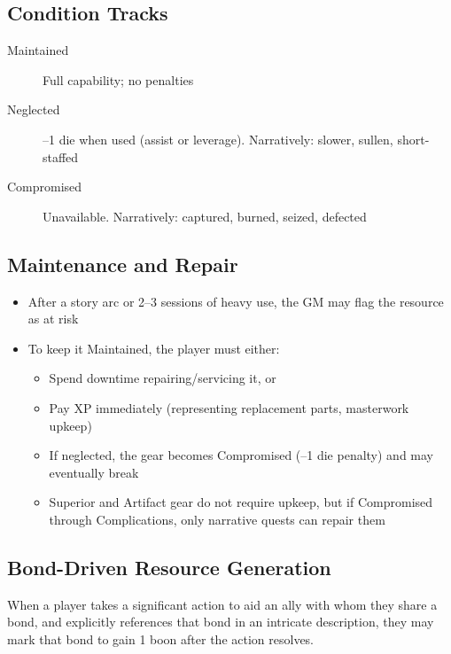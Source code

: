 \subsection{Condition Tracks}

\begin{description}
\item[Maintained] Full capability; no penalties
\item[Neglected] --1 die when used (assist or leverage). Narratively: slower, sullen, short-staffed
\item[Compromised] Unavailable. Narratively: captured, burned, seized, defected
\end{description}

\subsection{Maintenance and Repair}

\begin{itemize}
\item After a story arc or 2--3 sessions of heavy use, the GM may flag the resource as at risk
\item To keep it Maintained, the player must either:
  \begin{itemize}
  \item Spend downtime repairing/servicing it, or
  \item Pay XP immediately (representing replacement parts, masterwork upkeep)
  \item If neglected, the gear becomes Compromised (--1 die penalty) and may eventually break
  \item Superior and Artifact gear do not require upkeep, but if Compromised through Complications, only narrative quests can repair them
  \end{itemize}
\end{itemize}

\subsection{Bond-Driven Resource Generation}
When a player takes a significant action to aid an ally with whom they share a bond, and explicitly references that bond in an intricate description, they may mark that bond to gain 1 boon after the action resolves.

